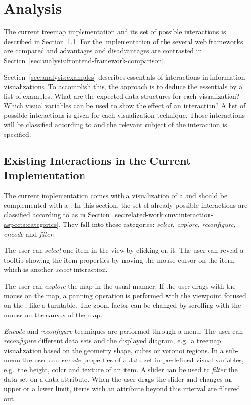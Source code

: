 \chapter{Analysis}\label{sec:analysis}
The current treemap implementation and its set of possible interactions is described in Section~\ref{sec:analysis:existing-interactions}.
For the implementation of the \gv{} several web frameworks are compared and advantages and disadvantages are contrasted in Section~\ref{sec:analysis:frontend-framework-comparison}.

Section~\ref{sec:analysis:examples} describes essentials of interactions in information visualizations.
To accomplish this, the approach is to deduce the essentials by a list of examples.
What are the expected data structures for each visualization?
Which visual variables can be used to show the effect of an interaction?
A list of possible interactions is given for each visualization technique.
Those interactions will be classified according to \textcite{Yi2007} and the relevant subject of the interaction is specified.



\section{Existing Interactions in the Current Implementation}\label{sec:analysis:existing-interactions}
The current implementation comes with a visualization of a \tmap{} and should be complemented with a \gv{}.
In this section, the set of already possible interactions are classified according to \textcite{Yi2007} as in Section~\ref{sec:related-work:cmv:interaction-aspects:categories}.
They fall into these categories: \emph{select}, \emph{explore}, \emph{reconfigure}, \emph{encode} and \emph{filter}.

The user can \emph{select} one item in the view by clicking on it.
The user can reveal a tooltip showing the item properties by moving the mouse cursor on the item, which is another \emph{select} interaction.

The user can \emph{explore} the map in the usual manner:
If the user drags with the mouse on the map, a panning operation is performed with the viewpoint focused on the \tmap{}, like a turntable.
The zoom factor can be changed by scrolling with the mouse on the canvas of the map.

\emph{Encode} and \emph{reconfigure} techniques are performed through a menu:
The user can \emph{reconfigure} different data sets and the displayed diagram, e.g.\ a treemap visualization based on the geometry shape, cubes or voronoi regions.
In a sub-menu the user can \emph{encode} properties of a data set in predefined visual variables, e.g.\ the height, color and texture of an item.
A slider can be used to \emph{filter} the data set on a data attribute.
When the user drags the slider and changes an upper or a lower limit, items with an attribute beyond this interval are filtered out.



